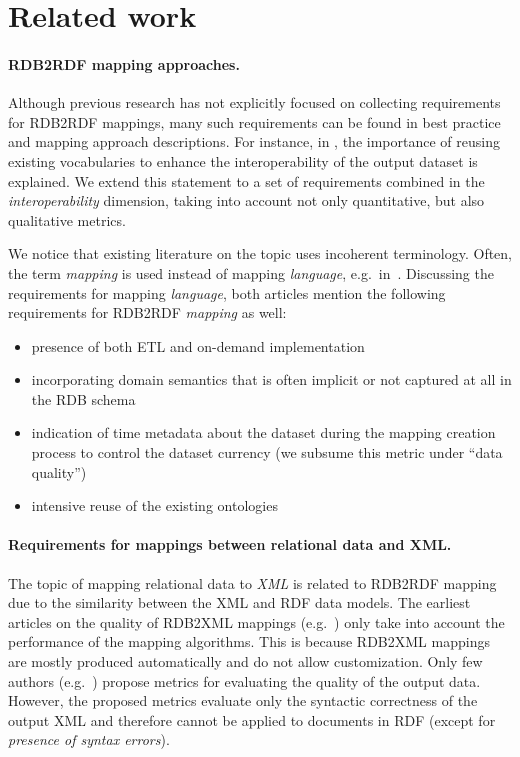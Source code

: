 \section{Related work}
\label{related_work}

\paragraph{RDB2RDF mapping approaches.}
Although previous research has not explicitly focused on collecting requirements for RDB2RDF mappings, many such requirements can be found in best practice and mapping approach descriptions.
For instance, in \cite{hillairet2008mde}, the importance of reusing existing vocabularies to enhance the interoperability of the output dataset is explained.
We extend this statement to a set of requirements combined in the \emph{interoperability} dimension, taking into account not only quantitative, but also qualitative metrics.

We notice that existing literature on the topic uses incoherent terminology.
Often, the term \emph{mapping} is used instead of mapping \emph{language}, e.g.\ in~\cite{Auer2010,Erling2008}. 
Discussing the requirements for mapping \emph{language}, both articles mention the following requirements for RDB2RDF \emph{mapping} as well:

\begin{itemize}
\item presence of both ETL and on-demand implementation
\item incorporating domain semantics that is often implicit or not captured at all in the RDB schema
\item indication of time metadata about the dataset during the mapping creation process to control the dataset currency (we subsume this metric under “data quality”)
\item intensive reuse of the existing ontologies
\end{itemize}    

\paragraph{Requirements for mappings between relational data and XML.}
The topic of mapping relational data to \emph{XML} is related to RDB2RDF mapping due to the similarity between the XML and RDF data models.
The earliest articles on the quality of RDB2XML mappings (e.g.~\cite{Schmidt, Shanmugasundaram}) only take into account the performance of the mapping algorithms.
This is because RDB2XML mappings are mostly produced automatically and do not allow customization.
Only few authors (e.g.~\cite{sahuguet2001everything}) propose metrics for evaluating the quality of the output data.
However, the proposed metrics evaluate only the syntactic correctness of the output XML and therefore cannot be applied to documents in RDF (except for \emph{presence of syntax errors}).

